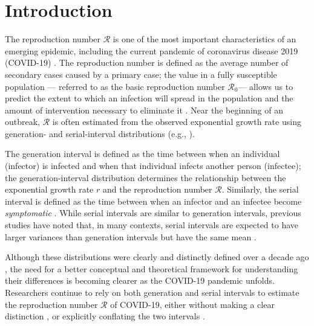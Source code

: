 \documentclass[12pt]{article}
\newcommand{\Rx}[1]{\ensuremath{{\mathcal R}_{#1}}\xspace}
\newcommand{\Ro}{\Rx{0}}
\newcommand{\RR}{\ensuremath{{\mathcal R}}\xspace}
\begin{document}
\pagebreak

\section{Introduction}

The reproduction number \RR is one of the most important characteristics of an emerging epidemic, including the current pandemic of coronavirus disease 2019 (COVID-19) \citep{majumder2020early}.
The reproduction number is defined as the average number of secondary cases caused by a primary case;
the value in a fully susceptible population --- referred to as the basic reproduction number \Ro --- allows us to predict the extent to which an infection will spread in the population and the amount of intervention necessary to eliminate it \citep{anderson1991infectious}.
Near the beginning of an outbreak, \RR is often estimated from the observed exponential growth rate using generation- and serial-interval distributions (e.g., \cite{wallinga2007generation, fraser2009pandemic, hampson2009transmission, chunara2012social, chowell2014west, du2020serial, jung2020real}).

The generation interval is defined as the time between when an individual (infector) is infected and when that individual infects another person (infectee);
the generation-interval distribution determines the relationship between the exponential growth rate $r$ and the reproduction number \RR \citep{anderson1991infectious, ferguson2005strategies, wallinga2007generation}.
Similarly, the serial interval is defined as the time between when an infector and an infectee become \emph{symptomatic} \citep{svensson2007note}.
While serial intervals are similar to generation intervals, previous studies have noted that, in many contexts, serial intervals are expected to have larger variances than generation intervals but have the same mean \citep{svensson2007note,klinkenberg2011correlation,te2013estimating,champredon2018equivalence}.

Although these distributions were clearly and distinctly defined over a decade ago \citep{svensson2007note}, 
the need for a better conceptual and theoretical framework for understanding their differences is becoming clearer as the COVID-19 pandemic unfolds.
Researchers continue to rely on both generation and serial intervals to estimate the reproduction number \RR of COVID-19, either without making a clear distinction \citep{tempvar,du2020serial,he2020temporal,wu2020nowcasting,zhao2020serial}, or explicitly conflating the two intervals
\citep{anderson2020will,hellewell2020feasibility}.
\end{document}
